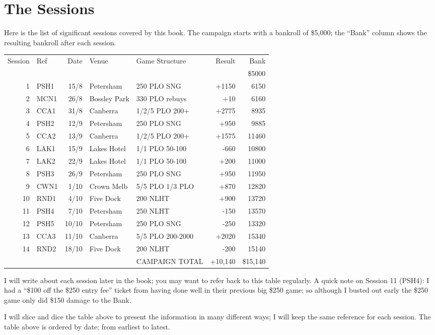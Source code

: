 \chapter{The Sessions}

Here is the list of significant sessions covered by this book. The
campaign starts with a bankroll of \$5,000; the ``Bank'' column shows
the resulting bankroll after each session.

\begin{tabular}{rlrllrr}
 Session & Ref & Date & Venue & Game Structure & Result & Bank \\
     &           &      &           &             &       & \$5000 \\
  1  &   PSH1    & 15/8 & Petersham & 250 PLO SNG & +1150 & 6150 \\
  2  &   MCN1    & 26/8 & Bossley Park & 330 PLO rebuys & +10 & 6160 \\
  3  &   CCA1    & 31/8 & Canberra  & 1/2/5 PLO 200+ & +2775 & 8935 \\
  4  &   PSH2    & 12/9 & Petersham & 250 PLO SNG & +950 & 9885 \\
  5  &   CCA2    & 13/9 & Canberra  & 1/2/5 PLO 200+ & +1575 & 11460 \\
  6  &   LAK1    & 15/9 & Lakes Hotel & 1/1 PLO 50-100 & -660 & 10800 \\
  7  &   LAK2    & 22/9 & Lakes Hotel & 1/1 PLO 50-100 & +200 & 11000 \\
  8  &   PSH3    & 26/9 & Petersham & 250 PLO SNG & +950 & 11950 \\
  9  &   CWN1    & 1/10 & Crown Melb & 5/5 PLO 1/3 PLO & +870 & 12820 \\
 10  &   RND1    & 4/10 & Five Dock & 200 NLHT & +900 & 13720 \\
 11  &   PSH4    & 7/10 & Petersham & 250 NLHT & -150 & 13570 \\
 12  &   PSH5    & 10/10 & Petersham & 250 PLO SNG & -250 & 13320 \\
 13  &   CCA3    & 11/10 & Canberra  & 5/5 PLO 200-2000 & +2020 & 15340 \\
 14  &   RND2    & 18/10 & Five Dock & 200 NLHT & -200 & 15140 \\
     &           &       &           & CAMPAIGN TOTAL & +10,140 & \$15,140 \\
\end{tabular}

I will write about each session later in the book; you may want to
refer back to this table regularly. A quick note on Session 11 (PSH4): I had
a ``\$100 off the \$250 entry fee'' ticket from having done well in
their previous big \$250 game; so although I busted out early the \$250
game only did \$150 damage to the Bank.

I will slice and dice the table above to present the information in
many different ways; I will keep the same reference for each
session. The table above is ordered by date; from earliest to latest.
